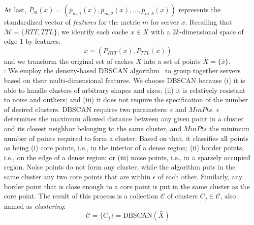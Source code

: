 \documentclass{acm_proc_article-sp}
\begin{document}
At last, $\bar{P}_m(x)=\left(\bar{p}_{m,1}(x),\bar{p}_{m,2}(x),\ldots,\bar{p}_{m,k}(x)\right)$ represents the standardized vector of {\it features} for the metric $m$ for server $x$.
Recalling that $\mathcal{M}=\{RTT,TTL\}$, we identify each cache $x\in X$ with a $2k$-dimensional space of edge 1 by features:
\begin{equation}
 \bar{x} = ( \bar{P}_{RTT}(x), \bar{P}_{TTL}(x))
\end{equation}
and we transform the original set of caches $X$ into a set of points $\bar{X}=\{\bar{x}\}$.
\\
:
We employ the density-based DBSCAN algorithm~\cite{ester1996density} to group together servers based on their multi-dimensional features. We choose DBSCAN because (i) it is able to handle clusters of arbitrary shapes and sizes; (ii) it is relatively resistant to noise and outliers; and (iii) it does not require the specification of the number of desired clusters. DBSCAN requires two parameters: $\epsilon$ and $MinPts$. $\epsilon$ determines the maximum allowed distance between any given point in a cluster and its closest neighbor belonging to the same cluster, and $MinPts$ the minimum number of points required to form a cluster. Based on that, it classifies all points as being (i) core points, i.e., in the interior of a dense region; (ii) border points, i.e., on the edge of a dense region; or (iii) noise points, i.e., in a sparsely occupied region. Noise points do not form any cluster, while the algorithm puts in the same cluster any two core points that are within $\epsilon$ of each other. Similarly, any border point that is close enough to a core point is put in the same cluster as the core point.
The result of this process is a collection $\mathcal{C}$ of clusters $C_j\in\mathcal{C}$, also named as \textit{clustering}:
\begin{equation}
 \mathcal{C} = \{C_j\}=\text{DBSCAN}(\bar{X})
\end{equation}
\end{document}
